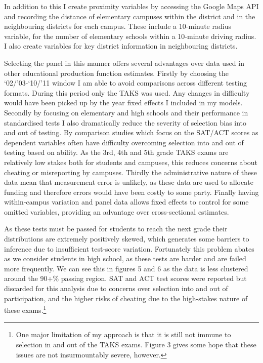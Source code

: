\documentclass[11pt]{article}
\begin{document}
In addition to this I create proximity variables by accessing the Google Maps API and recording the distance of elementary campuses within the district and in the neighbouring districts for each campus. These include a 10-minute radius variable, for the number of elementary schools within a 10-minute driving radius. I also create variables for key district information in neighbouring districts.

Selecting the panel in this manner offers several advantages over data used in other educational production function estimates. Firstly by choosing the ‘02/’03-‘10/’11 window I am able to avoid comparisons across different testing formats. During this period only the TAKS was used. Any changes in difficulty would have been picked up by the year fixed effects I included in my models. Secondly by focusing on elementary and high schools and their performance in standardised tests I also dramatically reduce the severity of selection bias into and out of testing. By comparison studies which focus on the SAT/ACT scores as dependent variables often have difficulty overcoming selection into and out of testing based on ability. As the 3rd, 4th and 5th grade TAKS exams are relatively low stakes both for students and campuses, this reduces concerns about cheating or misreporting by campuses. Thirdly the administrative nature of these data mean that measurement error is unlikely, as these data are used to allocate funding and therefore errors would have been costly to some party. Finally having within-campus variation and panel data allows fixed effects to control for some omitted variables, providing an advantage over cross-sectional estimates. 

As these tests must be passed for students to reach the next grade their distributions are extremely positively skewed, which generates some barriers to inference due to insufficient test-score variation. Fortunately this problem abates as we consider students in high school, as these tests are harder and are failed more frequently. We can see this in figures 5 and 6 as the data is less clustered around the 90+\% passing region. SAT and ACT test scores were reported but discarded for this analysis due to concerns over selection into and out of participation, and the higher risks of cheating due to the high-stakes nature of these exams.\footnote{One major limitation of my approach is that it is still not immune to selection in and out of the TAKS exams. Figure 3 gives some hope that these issues are not insurmountably severe, however.}
\end{document}
